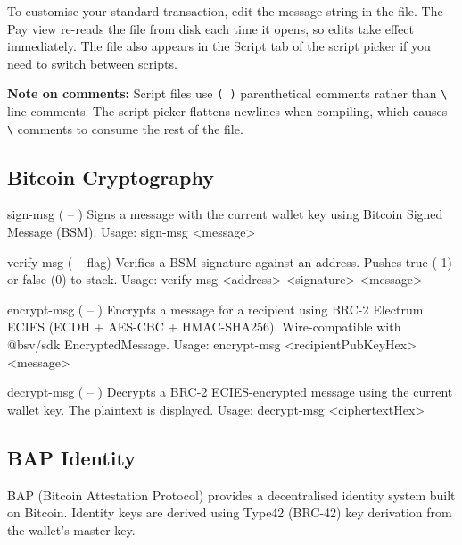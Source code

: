 \documentclass[a4paper, 11pt, openany]{book}
\begin{document}
To customise your standard transaction, edit the message string in the file. The Pay view re-reads the file from disk each time it opens, so edits take effect immediately. The file also appears in the Script tab of the script picker if you need to switch between scripts.

\begin{notebox}
\textbf{Note on comments:} Script files use \texttt{( )} parenthetical comments rather than \texttt{\textbackslash} line comments. The script picker flattens newlines when compiling, which causes \texttt{\textbackslash} comments to consume the rest of the file.
\end{notebox}

\subsection{Bitcoin Cryptography}

\begin{forthbox}
  sign-msg     ( -- )
               Signs a message with the current wallet key using
               Bitcoin Signed Message (BSM).
               Usage: sign-msg <message>

  verify-msg   ( -- flag)
               Verifies a BSM signature against an address. Pushes
               true (-1) or false (0) to stack.
               Usage: verify-msg <address> <signature> <message>

  encrypt-msg  ( -- )
               Encrypts a message for a recipient using BRC-2
               Electrum ECIES (ECDH + AES-CBC + HMAC-SHA256).
               Wire-compatible with @bsv/sdk EncryptedMessage.
               Usage: encrypt-msg <recipientPubKeyHex> <message>

  decrypt-msg  ( -- )
               Decrypts a BRC-2 ECIES-encrypted message using the
               current wallet key. The plaintext is displayed.
               Usage: decrypt-msg <ciphertextHex>
\end{forthbox}

\subsection{BAP Identity}

BAP (Bitcoin Attestation Protocol) provides a decentralised identity system built on Bitcoin. Identity keys are derived using Type42 (BRC-42) key derivation from the wallet's master key.
\end{document}
